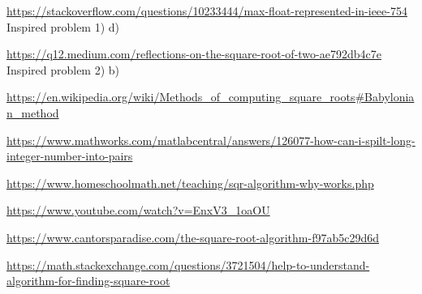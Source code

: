 \documentclass{uofa_template}
\begin{document}
\begin{enumerate}
\url{https://stackoverflow.com/questions/10233444/max-float-represented-in-ieee-754}
Inspired problem 1) d)

\url{https://q12.medium.com/reflections-on-the-square-root-of-two-ae792db4c7e} \\
Inspired problem 2) b)

\url{https://en.wikipedia.org/wiki/Methods_of_computing_square_roots#Babylonian_method}

\url{https://www.mathworks.com/matlabcentral/answers/126077-how-can-i-spilt-long-integer-number-into-pairs}

\url{https://www.homeschoolmath.net/teaching/sqr-algorithm-why-works.php}

\url{https://www.youtube.com/watch?v=EnxV3_1oaOU}

\url{https://www.cantorsparadise.com/the-square-root-algorithm-f97ab5c29d6d}

\url{https://math.stackexchange.com/questions/3721504/help-to-understand-algorithm-for-finding-square-root}

\end{enumerate}
\end{document}
